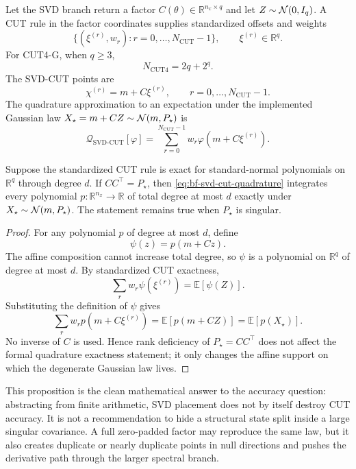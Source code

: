 Let the SVD branch return a factor $C(\theta)\in\mathbb R^{n_x\times q}$ and
let $Z\sim\mathcal{N}(0,I_q)$.  A CUT rule in the factor coordinates supplies
standardized offsets and weights
\[
  \{(\xi^{(r)},w_r): r=0,\ldots,N_{\mathrm{CUT}}-1\},
  \qquad
  \xi^{(r)}\in\mathbb R^q.
\]
For CUT4-G, when $q\ge3$,
\[
  N_{\mathrm{CUT4}}=2q+2^q .
\]
The SVD-CUT points are
\begin{equation}
\label{eq:bf-svd-cut-cloud}
  \chi^{(r)}=m+C\xi^{(r)},\qquad
  r=0,\ldots,N_{\mathrm{CUT}}-1.
\end{equation}
The quadrature approximation to an expectation under the implemented Gaussian
law $X_\star=m+CZ\sim\mathcal{N}(m,P_\star)$ is
\begin{equation}
\label{eq:bf-svd-cut-quadrature}
  \mathcal Q_{\mathrm{SVD}\text{-}\mathrm{CUT}}[\varphi]
  =
  \sum_{r=0}^{N_{\mathrm{CUT}}-1} w_r
  \varphi(m+C\xi^{(r)}).
\end{equation}

\begin{proposition}
\label{prop:bf-svd-cut-affine-exactness}
Suppose the standardized CUT rule is exact for standard-normal polynomials on
$\mathbb R^q$ through degree $d$.  If $C C^\top=P_\star$, then
\eqref{eq:bf-svd-cut-quadrature} integrates every polynomial
$p:\mathbb R^{n_x}\to\mathbb R$ of total degree at most $d$ exactly under
$X_\star\sim\mathcal{N}(m,P_\star)$.  The statement remains true when
$P_\star$ is singular.
\end{proposition}

\begin{proof}
For any polynomial $p$ of degree at most $d$, define
\[
  \psi(z)=p(m+Cz).
\]
The affine composition cannot increase total degree, so $\psi$ is a polynomial
on $\mathbb R^q$ of degree at most $d$.  By standardized CUT exactness,
\[
  \sum_r w_r \psi(\xi^{(r)})
  =
  \mathbb E[\psi(Z)].
\]
Substituting the definition of $\psi$ gives
\[
  \sum_r w_r p(m+C\xi^{(r)})
  =
  \mathbb E[p(m+CZ)]
  =
  \mathbb E[p(X_\star)].
\]
No inverse of $C$ is used.  Hence rank deficiency of $P_\star=C C^\top$ does
not affect the formal quadrature exactness statement; it only changes the
affine support on which the degenerate Gaussian law lives.
\end{proof}

This proposition is the clean mathematical answer to the accuracy question:
abstracting from finite arithmetic, SVD placement does not by itself destroy
CUT accuracy.  It is not a recommendation to hide a structural state split
inside a large singular covariance.  A full zero-padded factor may reproduce
the same law, but it also creates duplicate or nearly duplicate points in null
directions and pushes the derivative path through the larger spectral branch.

